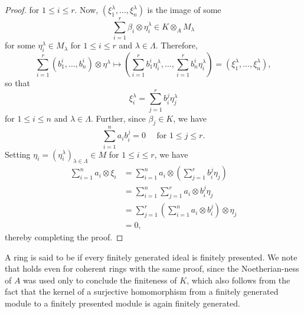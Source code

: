 \begin{proof}
    for $1\le i\le r$. Now, $\left(\xi_1^\lambda,\dots,\xi_n^\lambda\right)$ is the image of some 
    \begin{equation*}
        \sum_{i = 1}^r \beta_i\otimes\eta_i^\lambda\in K\otimes_A M_\lambda
    \end{equation*}
    for some $\eta^\lambda_i\in M_\lambda$ for $1\le i\le r$ and $\lambda\in\Lambda$.
    Therefore, 
    \begin{equation*}
        \sum_{i = 1}^r\left(b_1^i,\dots, b_n^i\right)\otimes\eta^\lambda\longmapsto\left(\sum_{i = 1}^r b_1^i\eta^\lambda_i,\dots, \sum_{i = 1}^r b_n^i\eta^\lambda_i\right) = \left(\xi_1^\lambda,\dots,\xi_n^\lambda\right),
    \end{equation*}
    so that 
    \begin{equation*}
        \xi_i^\lambda = \sum_{j = 1}^r b_i^j\eta^\lambda_j
    \end{equation*}
    for $1\le i\le n$ and $\lambda\in\Lambda$. Further, since $\beta_j\in K$, we have 
    \begin{equation*}
        \sum_{i = 1}^n a_ib_i^j = 0 \quad\text{ for }1\le j\le r.
    \end{equation*}
    Setting $\eta_i = \left(\eta_i^\lambda\right)_{\lambda\in\Lambda}\in M$ for $1\le i\le r$, we have 
    \begin{align*}
        \sum_{i = 1}^n a_i\otimes\xi_i &= \sum_{i = 1}^n a_i\otimes\left(\sum_{j = 1}^r b_i^j\eta_j\right)\\
        &= \sum_{i = 1}^n\sum_{j = 1}^r a_i\otimes b_i^j\eta_j\\
        &= \sum_{j = 1}^r \left(\sum_{i = 1}^n a_i\otimes b_i^j\right)\otimes\eta_j\\
        &= 0,
    \end{align*}
    thereby completing the proof.
\end{proof}

\begin{remark}
    A ring is said to be  if every finitely generated ideal is finitely presented. We note that  holds even for coherent rings with the same proof, since the Noetherian-ness of $A$ was used only to conclude the finiteness of $K$, which also follows from the fact that the kernel of a surjective homomorphism from a finitely generated module to a finitely presented module is again finitely generated.
\end{remark}